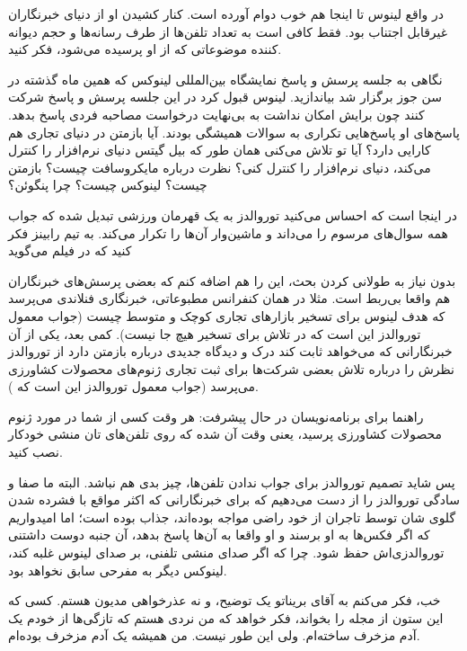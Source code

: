 \begin{journalinside}
در واقع لینوس تا اینجا هم خوب دوام آورده است. کنار کشیدن او از دنیای
خبرنگاران غیرقابل اجتناب بود. فقط کافی است به تعداد تلفن‌ها از طرف
رسانه‌ها و حجم دیوانه کننده موضوعاتی که از او پرسیده می‌شود، فکر کنید.

نگاهی به جلسه پرسش و پاسخ نمایشگاه بین‌المللی لینوکس که همین ماه گذشته
در سن جوز برگزار شد بیاندازید. لینوس قبول کرد در این جلسه پرسش و پاسخ
شرکت کنند چون برایش امکان نداشت به بی‌نهایت درخواست مصاحبه فردی پاسخ
بدهد. پاسخ‌های او پاسخ‌هایی تکراری به سوالات همیشگی بودند. آیا بازمتن در
دنیای تجاری هم کارایی دارد؟ آیا تو تلاش می‌کنی همان طور که بیل گیتس
دنیای نرم‌افزار را کنترل می‌کند، دنیای نرم‌افزار را کنترل کنی؟ نظرت
درباره مایکروسافت چیست؟ بازمتن چیست؟‌ لینوکس چیست؟ چرا پنگوئن؟

در اینجا است که احساس می‌کنید توروالدز به یک قهرمان ورزشی تبدیل شده که
جواب همه سوال‌های مرسوم را می‌داند و ماشین‌وار آن‌ها را تکرار می‌کند. به
تیم رابینز فکر کنید که در فیلم می‌گوید 

بدون نیاز به طولانی کردن بحث، این را هم اضافه کنم که بعضی پرسش‌های
خبرنگاران هم واقعا بی‌ربط است. مثلا در همان کنفرانس مطبوعاتی، خبرنگاری
فنلاندی می‌پرسد که هدف لینوس برای تسخیر بازارهای تجاری کوچک و متوسط
چیست (جواب معمول توروالدز این است که در تلاش برای تسخیر هیچ جا
نیست). کمی بعد، یکی از آن‌ خبرنگارانی که می‌خواهد ثابت کند درک و دیدگاه
جدیدی درباره بازمتن دارد از توروالدز نظرش را درباره تلاش بعضی شرکت‌ها
برای ثبت تجاری ژنوم‌های محصولات کشاورزی می‌پرسد (جواب معمول توروالدز این
است که ).

راهنما برای برنامه‌نویسان در حال پیشرفت: هر وقت کسی از شما در مورد ژنوم
محصولات کشاورزی پرسید، یعنی وقت آن شده که روی تلفن‌های تان منشی خودکار
نصب کنید.

پس شاید تصمیم توروالدز برای جواب ندادن تلفن‌ها، چیز بدی هم نباشد. البته
ما صفا و سادگی توروالدز را از دست می‌دهیم که برای خبرنگارانی که اکثر
مواقع با فشرده شدن گلوی شان توسط تاجران از خود راضی مواجه بوده‌اند،
جذاب بوده است؛ اما امیدواریم که اگر فکس‌ها به او برسند و او واقعا به
آن‌ها پاسخ بدهد، آن جنبه دوست داشتنی توروالدزی‌اش حفظ شود. چرا که اگر
صدای منشی تلفنی، بر صدای لینوس غلبه کند، لینوکس دیگر به مفرحی سابق
نخواهد بود.
\end{journalinside}

خب، فکر می‌کنم به آقای بریناتو یک توضیح، و نه عذرخواهی مدیون هستم. کسی
که این ستون از مجله  را بخواند، فکر خواهد که من نردی هستم که
تازگی‌ها از خودم یک آدم مزخرف ساخته‌ام. ولی این طور نیست. من همیشه یک
آدم مزخرف بوده‌ام.

